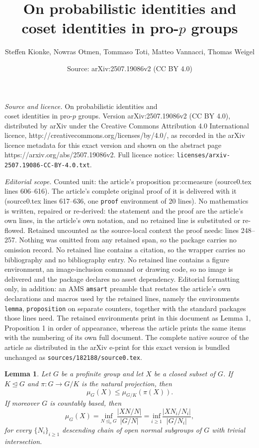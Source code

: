 \documentclass[10pt,a4paper]{amsart}
\title{On probabilistic identities and \\ coset identities in pro-$p$ groups}
\author{Steffen Kionke, Nowras Otmen, Tommaso Toti, Matteo Vannacci, Thomas Weigel}
\date{Source: arXiv:2507.19086v2 (CC BY 4.0)}
\newtheorem{lemma}{Lemma}
\begin{document}
\maketitle

\noindent\emph{Source and licence.} On probabilistic identities and \\ coset identities in pro-$p$ groups. Version arXiv:2507.19086v2 (CC BY 4.0), distributed by arXiv under the Creative Commons Attribution 4.0 International licence, http://creativecommons.org/licenses/by/4.0/, as recorded in the arXiv licence metadata for this exact version and shown on the abstract page https://arxiv.org/abs/2507.19086v2. Full licence notice: \texttt{licenses/arxiv-2507.19086-CC-BY-4.0.txt}.\par\smallskip

\noindent\textit{Editorial scope.} Counted unit: the article's proposition pr:ccmeasure (source0.tex lines 606--616). The article's complete original proof of it is delivered with it (source0.tex lines 617--636, one \texttt{proof} environment of 20 lines). No mathematics is written, repaired or re-derived: the statement and the proof are the article's own lines, in the article's own notation, and no retained line is substituted or re-flowed.  Retained uncounted as the source-local context the proof needs: lines 248--257.  Nothing was omitted from any retained span, so the package carries no omission record.  No retained line contains a citation, so the wrapper carries no bibliography and no bibliography entry.  No retained line contains a figure environment, an image-inclusion command or drawing code, so no image is delivered and the package declares no asset dependency.  Editorial formatting only, in addition: an AMS \texttt{amsart} preamble that restates the article's own declarations and macros used by the retained lines, namely the environments \texttt{lemma}, \texttt{proposition} on separate counters, together with the standard packages those lines need.  The retained environments print in this document as Lemma 1, Proposition 1 in order of appearance, whereas the article prints the same items with the numbering of its own full document.  The complete native source of the article as distributed in the arXiv e-print for this exact version is bundled unchanged as \texttt{sources/182188/source0.tex}.
\begin{lemma}\label{quotient}
	   	Let $G$ be a profinite group and let $X$ be a closed subset of $G$. If $K\unlhd G$ and $\pi\colon G\to G/K$ is the natural projection, then \begin{equation}\label{eq:leqquotient}
	   		\mu_G(X)\leq\mu_{G/K}(\pi(X)).
	   	\end{equation}
	   	 If moreover $G$ is countably based, then 
         \begin{equation}\label{eq:measurefinitequotients}
     	\mu_G(X)=\underset{N\unlhd_oG}{\mathrm{inf}}\frac{|XN/N|}{|G/N|}=\underset{i\geq 1}{\mathrm{inf}}\frac{|XN_i/N_i|}{|G/N_i|},
     \end{equation}
     for every $\{N_i\}_{i\geq 1}$ descending chain of open normal subgroups of $G$ with trivial intersection.
\end{lemma}
\end{document}
